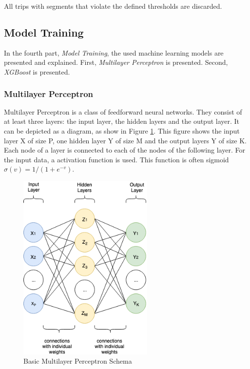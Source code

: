 All trips with segments that violate the defined thresholds are discarded.

\subsection{Model Training}
In the fourth part, \textit{Model Training}, the used machine learning models are presented and explained. First, \textit{Multilayer Perceptron} is presented. Second, \textit{XGBoost} is presented. 

\subsubsection{Multilayer Perceptron}
Multilayer Perceptron is a class of feedforward neural networks. They consist of at least three layers: the input layer, the hidden layers and the output layer. It can be depicted as a diagram, as show in Figure \ref{fig:mlp-struc}. This figure shows the input layer X of size P, one hidden layer Y of size M and the output layers Y of size K. Each node of a layer is connected to each of the nodes of the following layer. For the input data, a activation function is used. This function is often sigmoid $\sigma(v) = 1/(1+e^{-v})$. \cite{hastie2005elements}

\begin{figure}[h]
    \centering
    \includegraphics[width=0.6\textwidth]{images/nn_struct.png}
    \caption{Basic Multilayer Perceptron Schema}
    \label{fig:mlp-struc}
\end{figure}

